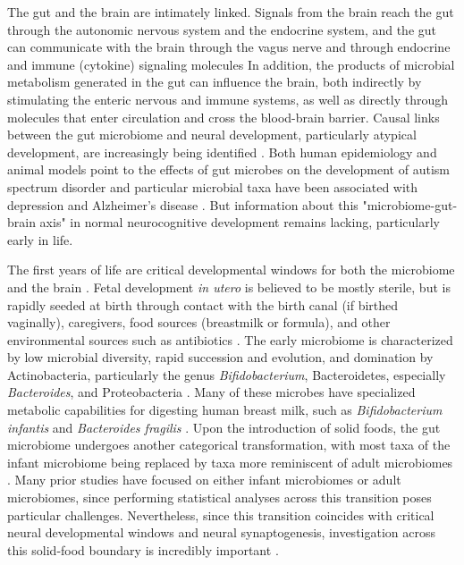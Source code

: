 The gut and the brain are intimately linked. Signals from the brain
reach the gut through the autonomic nervous system and the endocrine
system, and the gut can communicate with the brain through the vagus
nerve and through endocrine and immune (cytokine) signaling molecules
\cite{cerdoEarlyNutritionGut2019,pronovostPerinatalInteractionsMicrobiome2019,sharonCentralNervousSystem2016,togniniGutMicrobiotaPotential2017}
In addition, the products of microbial metabolism generated in the gut can
influence the brain, both indirectly by stimulating the enteric nervous
and immune systems, as well as directly through molecules that enter
circulation and cross the blood-brain barrier. Causal links between the
gut microbiome and neural development, particularly atypical
development, are increasingly being identified
\cite{spichakMiningMicrobesMental2021}.
Both human epidemiology and animal models point to the effects
of gut microbes on the development of autism spectrum disorder
\cite{laueProspectiveAssociationsInfant2020,wanUnderdevelopmentGutMicrobiota2021}
and particular microbial taxa have been associated with depression
\cite{mayneris-perxachsMicrobiotaAlterationsProline2022,valles-colomerNeuroactivePotentialHuman2019}
and Alzheimer's disease
\cite{fungInteractionsMicrobiotaImmune2017,kimProbioticSupplementationImproves2021}.
But information about this "microbiome-gut-brain
axis" in normal neurocognitive development remains lacking,
particularly early in life.

The first years of life are critical developmental windows for both the
microbiome and the brain
\cite{laueDevelopingMicrobiomeBirth2022}.
Fetal development \emph{in utero} is believed to be mostly sterile, but
is rapidly seeded at birth through contact with the birth canal (if
birthed vaginally), caregivers, food sources (breastmilk or formula),
and other environmental sources such as antibiotics
\cite{backhedDynamicsStabilizationHuman2015,bokulichAntibioticsBirthMode2016}.
The early microbiome is characterized by low microbial
diversity, rapid succession and evolution, and domination by
Actinobacteria, particularly the genus \emph{Bifidobacterium},
Bacteroidetes, especially \emph{Bacteroides}, and Proteobacteria
\cite{koenigSuccessionMicrobialConsortia2011}.
Many of these microbes have specialized metabolic capabilities
for digesting human breast milk, such as \emph{Bifidobacterium infantis}
and \emph{Bacteroides fragilis}
\cite{selaGenomeSequenceBifidobacterium2008}.
Upon the introduction of solid foods, the gut
microbiome undergoes another categorical transformation, with most taxa
of the infant microbiome being replaced by taxa more reminiscent of
adult microbiomes
\cite{backhedDynamicsStabilizationHuman2015}.
Many prior studies have focused on either infant microbiomes or
adult microbiomes, since performing statistical analyses across this
transition poses particular challenges. Nevertheless, since this
transition coincides with critical neural developmental windows and
neural synaptogenesis, investigation across this solid-food boundary is
incredibly important
\cite{tauNormalDevelopmentBrain2010}.

